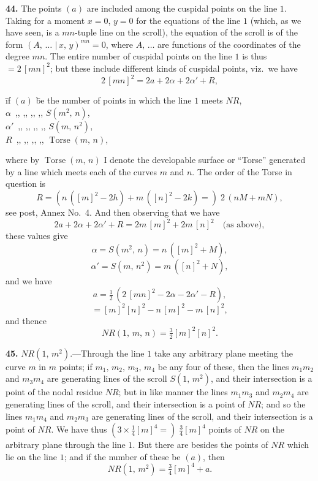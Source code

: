 \documentclass[11pt,a4paper]{article}
\providecommand{\mid}{\,|\,}
\providecommand{\Torse}{\operatorname{Torse}}
\begin{document}
\medskip

\textbf{44.} The points $(a)$ are included among the cuspidal points on the line $1$. Taking for a moment $x = 0$, $y = 0$ for the equations of the line $1$ (which, as we have seen, is a $mn$-tuple line on the scroll), the equation of the scroll is of the form $(A,\,\ldots\, \mid x,\,y)^{mn} = 0$, where $A,\,\ldots$ are functions of the coordinates of the degree $mn$. The entire number of cuspidal points on the line $1$ is thus $= 2\,[mn]^2$; but these include different kinds of cuspidal points, viz.\ we have
\[
2\,[mn]^2 = 2a + 2\alpha + 2\alpha' + R,
\]
\begin{tabbing}
\hspace{4em}\=if $(a)$ \=be the number of points in which the line $1$ meets $NR$,\\
\>$\alpha$  \>$\,$,, \;,, \;,, \;,, \quad $S(m^2,\,n)$,\\
\>$\alpha'$ \>$\,$,, \;,, \;,, \;,, \quad $S(m,\,n^2)$,\\
\>$R$       \>$\,$,, \;,, \;,, \;,, \quad $\Torse(m,\,n)$,
\end{tabbing}
where by $\Torse(m,\,n)$ I denote the developable surface or ``Torse'' generated by a line which meets each of the curves $m$ and $n$. The order of the Torse in question is
\[
R = (n\,([m]^2 - 2h) + m\,([n]^2 - 2k) =)\; 2\,(nM + mN),
\]
see post, Annex No.~4. And then observing that we have
\[
2a + 2\alpha + 2\alpha' + R = 2m\,[m]^2 + 2m\,[n]^2 \quad\text{(as above)},
\]
these values give
\[
\alpha = S(m^2,\,n) = n\,([m]^2 + M),
\]
\[
\alpha' = S(m,\,n^2) = m\,([n]^2 + N),
\]
and we have
\[
a = \tfrac{1}{2}\,(2\,[mn]^2 - 2\alpha - 2\alpha' - R),
\]
\[
= [m]^2 [n]^2 - n\,[m]^2 - m\,[n]^2,
\]
and thence
\[
NR(1,\,m,\,n) = \tfrac{3}{2}[m]^2 [n]^2.
\]

\medskip

\textbf{45.} $NR(1,\,m^2)$.---Through the line $1$ take any arbitrary plane meeting the curve $m$ in $m$ points; if $m_1,\,m_2,\,m_3,\,m_4$ be any four of these, then the lines $m_1 m_2$ and $m_3 m_4$ are generating lines of the scroll $S(1,\,m^2)$, and their intersection is a point of the nodal residue $NR$; but in like manner the lines $m_1 m_3$ and $m_2 m_4$ are generating lines of the scroll, and their intersection is a point of $NR$; and so the lines $m_1 m_4$ and $m_2 m_3$ are generating lines of the scroll, and their intersection is a point of $NR$. We have thus $(3 \times \tfrac{1}{4}[m]^4 =)\;\tfrac{3}{4}[m]^4$ points of $NR$ on the arbitrary plane through the line $1$. But there are besides the points of $NR$ which lie on the line $1$; and if the number of these be $(a)$, then
\[
NR(1,\,m^2) = \tfrac{3}{4}[m]^4 + a.
\]
\end{document}
